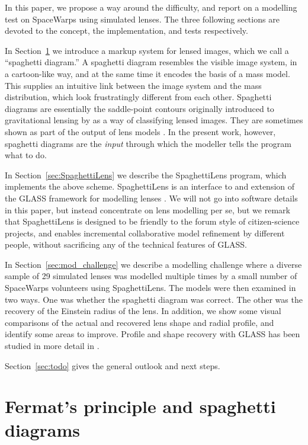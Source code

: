 \documentclass[usenatbib]{mn2e}
\newcommand{\spl}{SpaghettiLens\xspace}
\newcommand{\sw}{SpaceWarps\xspace}
\newcommand{\secref}[1]{Section~\ref{sec:#1}}
\begin{document}
In this paper, we propose a way around the difficulty, and report on a
modelling test on \sw using simulated lenses.  The three following
sections are devoted to the concept, the implementation, and tests
respectively.

In \secref{Fermat} we introduce a markup system for lensed images,
which we call a ``spaghetti diagram.''  A spaghetti diagram resembles
the visible image system, in a cartoon-like way, and at the same time
it encodes the basis of a mass model.  This supplies an intuitive link
between the image system and the mass distribution, which look
frustratingly different from each other.  Spaghetti diagrams are
essentially the saddle-point contours originally introduced to
gravitational lensing by \cite{1986ApJ...310..568B} as a way of
classifying lensed images.  They are sometimes shown as part of the
output of lens models \citep[for
example][]{2001ApJ...557..594R,2003ApJ...590...39K,Lubini2012}.  In
the present work, however, spaghetti diagrams are the {\em input\/}
through which the modeller tells the program what to do.

In \secref{SpaghettiLens} we describe the \spl program, which
implements the above scheme.  \spl is an interface to and
extension of the GLASS framework for modelling lenses
\citep{2014arXiv1401.7990C}.  We will not go into software details in
this paper, but instead concentrate on lens modelling per se, but we
remark that \spl is designed to be friendly to the forum style of
citizen-science projects, and enables incremental collaborative
model refinement by different people, without sacrificing any of the
technical features of GLASS.

In \secref{mod_challenge} we describe a modelling challenge where a
diverse sample of 29 simulated lenses was modelled multiple times
by a small number of \sw volunteers using \spl.  The models
were then examined in two ways.  One was whether the spaghetti diagram
was correct.  The other was the recovery of the Einstein radius of the
lens.  In addition, we show some visual comparisons of the actual and
recovered lens shape and radial profile, and identify some areas to
improve. Profile and shape recovery with GLASS has been studied in
more detail in \citep{2014arXiv1401.7990C}.

\secref{todo} gives the general outlook and next steps.


\section{Fermat's principle and spaghetti diagrams} \label{sec:Fermat}
\end{document}
